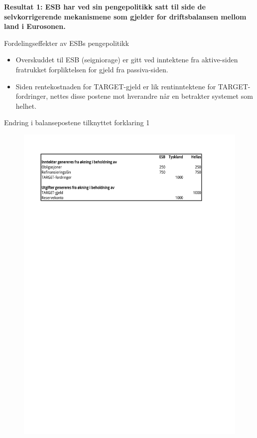\documentclass[notes=show notes]{beamer}
\begin{document}
\begin{frame}
	\textbf{Resultat 1: ESB har ved sin pengepolitikk satt til side de selvkorrigerende mekanismene som gjelder for driftsbalansen mellom land i Eurosonen.}
\end{frame}
\begin{frame}{Fordelingseffekter av ESBs pengepolitikk}
\begin{itemize}
	\item Overskuddet til ESB (seigniorage) er gitt ved inntektene fra aktive-siden fratrukket forpliktelsen for gjeld fra passiva-siden.
	\item Siden rentekostnaden for TARGET-gjeld er lik rentinntektene for TARGET-fordringer, nettes disse postene mot hverandre n\aa r en betrakter systemet som helhet.
\end{itemize}
\end{frame}	
\begin{frame}{Endring i balansepostene tilknyttet forklaring 1}
\begin{figure}
\centering
\includegraphics[width=0.9\linewidth]{SenFork1-1}
\caption{}
\label{fig:SenFork1-1}
\end{figure}
\end{frame}	
\end{document}
